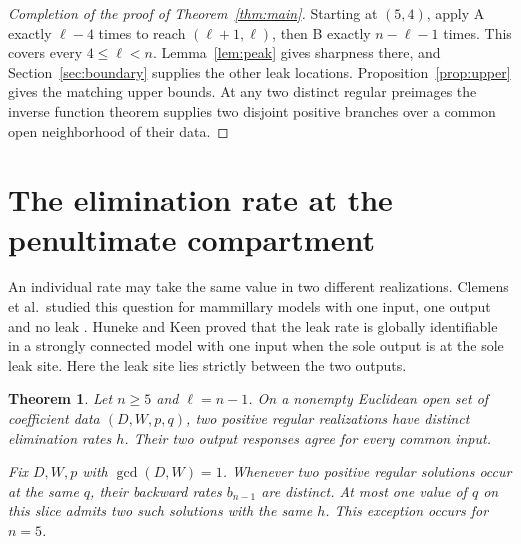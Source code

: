 \documentclass[11pt,a4paper]{article}
\newtheorem{theorem}{Theorem}
\begin{document}
\begin{proof}[Completion of the proof of Theorem~\ref{thm:main}]
Starting at \((5,4)\), apply A exactly \(\ell-4\) times to reach
\((\ell+1,\ell)\), then B exactly \(n-\ell-1\) times. This covers every
\(4\le\ell<n\). Lemma~\ref{lem:peak} gives sharpness there, and Section~\ref{sec:boundary}
supplies the other leak locations. Proposition~\ref{prop:upper} gives the
matching upper bounds. At any two distinct regular preimages the inverse
function theorem supplies two disjoint positive branches over a common
open neighborhood of their data.
\end{proof}

\section{The elimination rate at the penultimate compartment}\label{sec:preterminal}
An individual rate may take the same value in two different realizations.
Clemens et al.\ studied this question for mammillary models with one input,
one output and no leak \cite[Theorem~3.2]{clemens}. Huneke and Keen
\cite[Proposition~4.5]{huneke} proved that the leak rate is globally identifiable
in a strongly connected model with one input when the sole output is at the
sole leak site. Here the leak site lies strictly between the two outputs.

\begin{theorem}\label{thm:preterminal}
Let \(n\ge5\) and \(\ell=n-1\). On a nonempty Euclidean open set of coefficient
data \((D,W,p,q)\), two positive regular realizations have distinct elimination
rates \(h\). Their two output responses agree for every common input.

Fix \(D,W,p\) with \(\gcd(D,W)=1\). Whenever two positive regular solutions
occur at the same \(q\), their backward rates \(b_{n-1}\) are distinct.
At most one value of \(q\) on this slice admits two such solutions with
the same \(h\). This exception occurs for \(n=5\).
\end{theorem}
\end{document}
